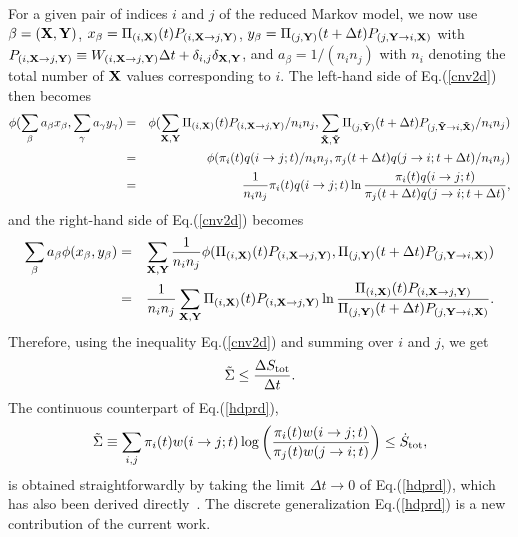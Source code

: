 \documentclass[aps,pre,amsmath,amssymb,floatfix,preprint,nofootinbib]{revtex4}
\begin{document}
For a given pair of indices $i$ and $j$ of the reduced Markov model, we now use $\beta = ({\bf X},{\bf Y})$, $x_\beta = \Pi_{(i,{\bf X})}(t) P_{(i,{\bf X} \to j,{\bf Y})}$, $y_\beta = \Pi_{(j,{\bf Y})}(t + \Delta t) P_{(j,{\bf Y} \to i,{\bf X})}$ with $P_{(i,{\bf X} \to j,{\bf Y})} \equiv  W_{(i,{\bf X} \to j,{\bf Y})}\Delta t + \delta_{i,j} \delta_{\bf X,\bf Y}$, and $a_\beta = 1/(n_i n_j)$ with $n_i$ denoting the total number of ${\bf X}$ values corresponding to $i$. The left-hand side of Eq.(\ref{cnv2d}) then becomes
\begin{eqnarray}
\phi (\sum_\beta a_\beta x_\beta,\sum_\gamma a_\gamma y_\gamma) &=&
\phi (\sum_{{\bf X},{\bf Y}} \Pi_{(i,{\bf X})}(t) P_{(i,{\bf X} \to j,{\bf Y})}/n_i n_j ,\sum_{{\bf \tilde X},{\bf \tilde Y}} \Pi_{(j,{\bf \tilde Y})}(t+ \Delta t)P_{(j,{\bf \tilde Y} \to i,{\bf \tilde X})}/n_i n_j) \nonumber\\
&=& \phi (\pi_i (t) q (i  \to j; t)/n_i n_j , \pi_j (t+ \Delta t) q (j  \to i; t+ \Delta t)/n_i n_j) \nonumber\\
&=& \frac{1}{n_i n_j} \pi_i (t) q (i  \to j; t) \ln \frac{\pi_i (t) q (i  \to j; t)}{\pi_j (t + \Delta t) q (j  \to i; t + \Delta t)}
,
\end{eqnarray}
and the right-hand side of Eq.(\ref{cnv2d}) becomes
\begin{eqnarray}
\sum_\beta a_\beta \phi (x_\beta,y_\beta) &=&
\sum_{{\bf X},{\bf Y}} \frac{1}{n_i n_j } \phi ( \Pi_{(i,{\bf X})}(t) P_{(i,{\bf X} \to j,{\bf Y})}, \Pi_{(j,{\bf Y})}(t+ \Delta t) P_{(j,{\bf Y} \to i,{\bf X})})  \nonumber\\
&=& \frac{1}{n_i n_j} \sum_{{\bf X},{\bf Y}}  \Pi_{(i,{\bf X})}(t) P_{(i,{\bf X} \to j,{\bf Y})}  \ln \frac{\Pi_{(i,{\bf X})}(t) P_{(i,{\bf X} \to j,{\bf Y})}}{\Pi_{(j,{\bf Y})}(t+ \Delta t) P_{(j,{\bf Y} \to i,{\bf X})}}.
\end{eqnarray}
Therefore, using the inequality Eq.(\ref{cnv2d}) and summing over $i$ and $j$, we get
\begin{equation}
\tilde \Sigma  \le \frac{\Delta S_{\rm tot}}{\Delta t}. \label{hdprd}
\end{equation}
The continuous counterpart of Eq.(\ref{hdprd}),
\begin{equation}
\tilde \Sigma  \equiv \sum_{i,j} \pi_i(t) w(i \to j; t) \log \left(\frac{ \pi_i(t) w(i \to j;t)}{\pi_j(t)  w(j \to i;t)} \right) \le \dot S_{\rm tot}, \label{hdprc}
\end{equation}
is obtained straightforwardly by taking the limit $\Delta t \to 0$ of Eq.(\ref{hdprd}), which has also been derived directly~\cite{zmh}. The discrete generalization Eq.(\ref{hdprd}) is a new contribution of the current work.
 
\end{document}
